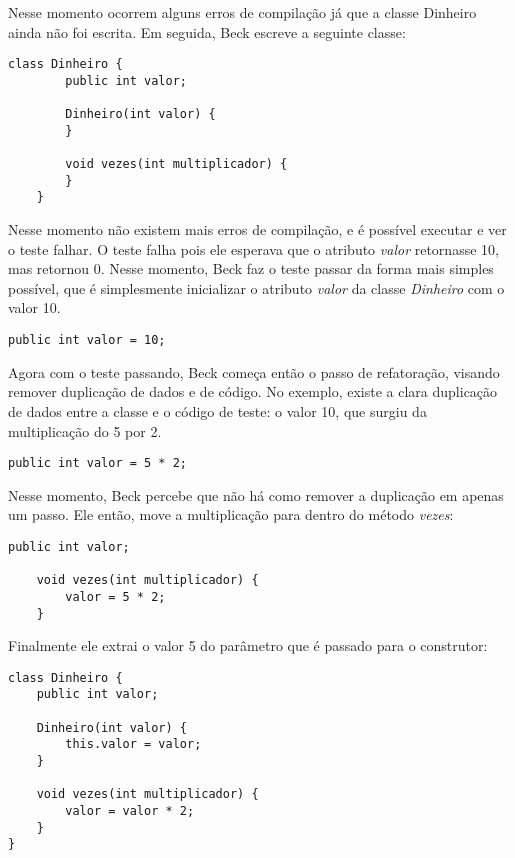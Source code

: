 Nesse momento ocorrem alguns erros de compilação já que a classe Dinheiro ainda não foi escrita. Em seguida, Beck escreve
a seguinte classe:

\begin{lstlisting}[frame=trbl]
	class Dinheiro {
		public int valor;
		
		Dinheiro(int valor) {
		}
		
		void vezes(int multiplicador) {
		}
	}
\end{lstlisting}

Nesse momento não existem mais erros de compilação, e é possível executar e ver o teste falhar. O teste falha pois ele esperava
que o atributo \textit{valor} retornasse 10, mas retornou 0. Nesse momento, Beck faz o teste passar da forma mais simples possível,
que é simplesmente inicializar o atributo \textit{valor} da classe \textit{Dinheiro} com o valor 10.

\begin{lstlisting}[frame=trbl]
	public int valor = 10;
\end{lstlisting}

Agora com o teste passando, Beck começa então o passo de refatoração, visando remover duplicação de dados e de código. No exemplo,
existe a clara duplicação de dados entre a classe e o código de teste: o valor 10, que surgiu da multiplicação do 5 por 2. 

\begin{lstlisting}[frame=trbl]
	public int valor = 5 * 2;
\end{lstlisting}

Nesse momento, Beck percebe que não há como remover a duplicação em apenas um passo. Ele então, move a multiplicação para dentro
do método \textit{vezes}:

\begin{lstlisting}[frame=trbl]
	public int valor;
	
	void vezes(int multiplicador) {
		valor = 5 * 2;
	}
\end{lstlisting}

Finalmente ele extrai o valor 5 do parâmetro que é passado para o construtor:

\begin{lstlisting}[frame=trbl]
class Dinheiro {
	public int valor;
	
	Dinheiro(int valor) {
		this.valor = valor;
	}
	
	void vezes(int multiplicador) {
		valor = valor * 2;
	}
}
\end{lstlisting}

